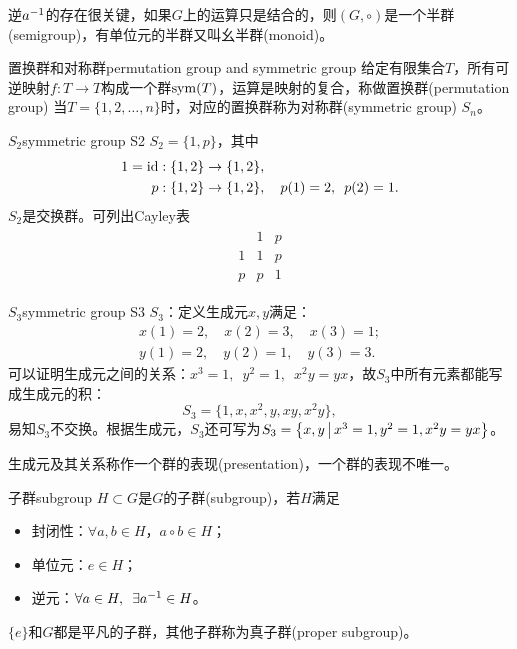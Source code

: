 逆$a^{-1}$的存在很关键，如果$G$上的运算只是结合的，则$(G,\circ)$是一个半群(semigroup)，有单位元的半群又叫幺半群(monoid)。
\begin{definition}{置换群和对称群}{permutation group and symmetric group}
	给定有限集合$T$，所有可逆映射$f:T\to T$构成一个群$\operatorname{sym}(T)$，运算是映射的复合，称做置换群(permutation group)
	\tcblower
	当$T=\{1,2,\ldots,n\}$时，对应的置换群称为对称群(symmetric group) $S_n$。
\end{definition}
\begin{example}{$S_2$}{symmetric group S2}
	$S_2=\{1,p\}$，其中 
		\begin{align*}
			1=\operatorname{id}:\{1,2\}\to\{1,2\}&,\\
			p:\{1,2\}\to\{1,2\}&,\quad p(1)=2,\enspace p(2)=1.
		\end{align*}
		$S_2$是交换群。可列出Cayley表
		\begin{align*}
			\begin{array}{c|cc}
				&1&p\\
				\hline
				1&1&p\\
				p&p&1
			\end{array}
		\end{align*}
\end{example}
\begin{example}{$S_3$}{symmetric group S3}
	$S_3$：定义生成元$x,y$满足：
	\begin{align*}
		x(1)=2,\quad x(2)=3,\quad x(3)=1;\\
		y(1)=2,\quad y(2)=1,\quad y(3)=3.
	\end{align*}
	可以证明生成元之间的关系：$x^3=1,\enspace y^2=1,\enspace x^2y=yx$，故$S_3$中所有元素都能写成生成元的积：
	\[
		S_3=\{1,x,x^2,y,xy,x^2y\},
	\]
	易知$S_3$不交换。根据生成元，$S_3$还可写为$S_3=\left\{x,y\,\middle\vert\,x^3=1,y^2=1,x^2y=yx\right\}$。
	
	生成元及其关系称作一个群的表现(presentation)，一个群的表现不唯一。
\end{example}
\begin{definition}{子群}{subgroup}
	$H\subset G$是$G$的子群(subgroup)，若$H$满足
	\begin{itemize}
		\item 封闭性：$\forall a,b\in H$，$a\circ b\in H$；
		\item 单位元：$e\in H$；
		\item 逆元：$\forall a\in H,\enspace\exists a^{-1}\in H$。
	\end{itemize}
	$\{e\}$和$G$都是平凡的子群，其他子群称为真子群(proper subgroup)。
\end{definition}

